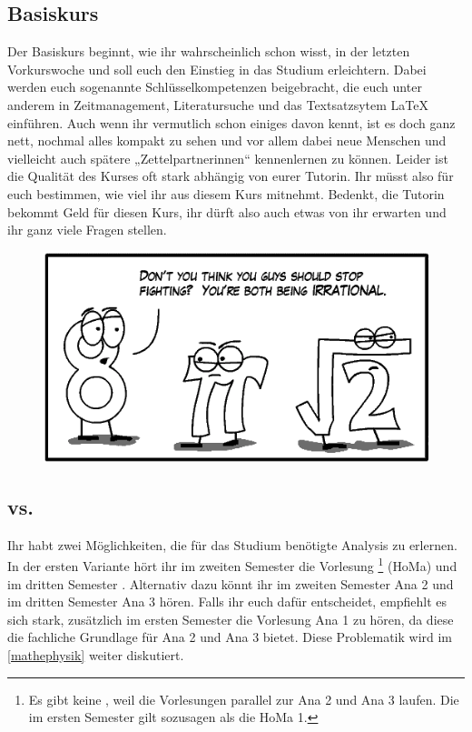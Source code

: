 \subsection{Basiskurs}
Der Basiskurs beginnt, wie ihr wahrscheinlich schon wisst, in der letzten Vorkurswoche und soll euch den Einstieg in das Studium erleichtern. Dabei werden euch sogenannte Schlüsselkompetenzen beigebracht, die euch unter anderem in Zeitmanagement, Literatursuche und das Textsatzsytem \LaTeX{} einführen. Auch wenn ihr vermutlich schon einiges davon kennt, ist es doch ganz nett, nochmal alles kompakt zu sehen und vor allem dabei neue Menschen und vielleicht auch spätere „Zettelpartnerinnen“ kennenlernen zu können. Leider ist die Qualität des Kurses oft stark abhängig von eurer Tutorin. Ihr müsst also für euch bestimmen, wie viel ihr aus diesem Kurs mitnehmt. Bedenkt, die Tutorin bekommt Geld für diesen Kurs, ihr dürft also auch etwas von ihr erwarten und ihr ganz viele Fragen stellen.

\begin{figure}[b]
	\centering
	\includegraphics[width=\linewidth]{bilder/both_irrational.png}
\end{figure}


\subsection{ vs.~}
Ihr habt zwei Möglichkeiten, die für das Studium benötigte Analysis zu erlernen.
In der ersten Variante hört ihr im zweiten Semester die Vorlesung \footnote{Es gibt keine , weil die Vorlesungen parallel zur \gls{Ana} 2 und \gls{Ana} 3 laufen. Die  im ersten Semester gilt sozusagen als die \gls{HoMa} 1.} (\gls{HoMa}) und im dritten Semester . Alternativ dazu könnt ihr im zweiten Semester \gls{Ana} 2 und im dritten Semester \gls{Ana} 3 hören. Falls ihr euch dafür entscheidet, empfiehlt es sich stark, zusätzlich im ersten Semester die Vorlesung \gls{Ana} 1 zu hören, da diese die fachliche Grundlage für \gls{Ana} 2 und \gls{Ana} 3 bietet. Diese Problematik wird im \autoref{mathephysik} weiter diskutiert.

